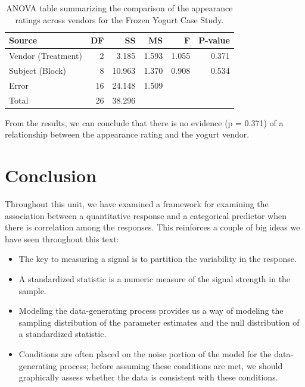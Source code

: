 \documentclass[
]{book}
\providecommand{\tightlist}{%
  \setlength{\itemsep}{0pt}\setlength{\parskip}{0pt}}
\theoremstyle{plain}
\theoremstyle{mydefn}
\theoremstyle{myexmpl}
\theoremstyle{remark}
\begin{document}
\begin{table}

\caption{\label{tab:blockrecap-anova-table}ANOVA table summarizing the comparison of the appearance ratings across vendors for the Frozen Yogurt Case Study.}
\centering
\begin{tabular}[t]{l|r|r|r|r|r}
\hline
Source & DF & SS & MS & F & P-value\\
\hline
Vendor (Treatment) & 2 & 3.185 & 1.593 & 1.055 & 0.371\\
\hline
Subject (Block) & 8 & 10.963 & 1.370 & 0.908 & 0.534\\
\hline
Error & 16 & 24.148 & 1.509 &  & \\
\hline
Total & 26 & 38.296 &  &  & \\
\hline
\end{tabular}
\end{table}

From the results, we can conclude that there is no evidence (p = 0.371) of a relationship between the appearance rating and the yogurt vendor.

\hypertarget{conclusion-1}{%
\section{Conclusion}\label{conclusion-1}}

Throughout this unit, we have examined a framework for examining the association between a quantitative response and a categorical predictor when there is correlation among the responses. This reinforces a couple of big ideas we have seen throughout this text:

\begin{itemize}
\tightlist
\item
  The key to measuring a signal is to partition the variability in the response.
\item
  A standardized statistic is a numeric measure of the signal strength in the sample.
\item
  Modeling the data-generating process provides us a way of modeling the sampling distribution of the parameter estimates and the null distribution of a standardized statistic.
\item
  Conditions are often placed on the noise portion of the model for the data-generating process; before assuming these conditions are met, we should graphically assess whether the data is consistent with these conditions.
\end{itemize}
\end{document}
